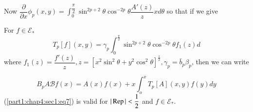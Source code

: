  Now $\dfrac{\partial}{\partial x} \phi_p (x, y) =
 \int_{0}^{\dfrac{\pi}{2}} \sin^{2p+2} \theta  \cos^{-2p} \theta 
 \dfrac{A' (z)}{z}x d \theta $ so that if we give 

\begin{defn}\label{part1:chap4:sec1:def3}%
  For $f \in \mathscr{E}_{*}$
  $$
  T_p [f] (x, y) = \gamma_p \int^{\frac{\pi}{2}}_0 \sin^{2p+2} \theta 
  \cos^{-2p}\theta  f_1 (z) d 
  $$
  where $f_1 (z) = \dfrac{f'(z)}{z}, z = \left[ x^2 \sin^2 \theta  +
    y^2 \cos^2 \theta  \right]^{\frac{1}{2}}, \gamma_p = \bar{b}_p
  \beta_p$, then we can write 	 
\end{defn} 

\begin{equation*}
  B_p A \mathscr{B} f(x) = A (x) f(x) + x \int^{x}_o T_p [A] (x, y)
  f(y) dy \tag{7}\label{part1:chap4:sec1:eq7} 
\end{equation*} 
(\ref{part1:chap4:sec1:eq7}) is valid for $| \operatorname{Rep} | < \dfrac{1}{2}$
and $f \in \mathscr{E}_{*}$. 

